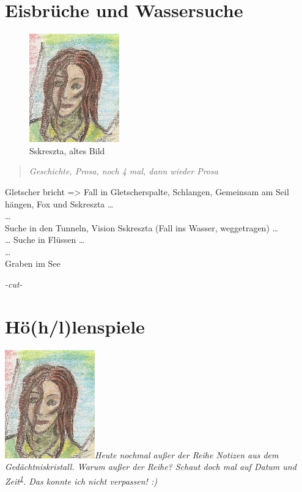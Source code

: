 \documentclass[11pt]{article}
\begin{document}
\section{Eisbrüche und Wassersuche}

\begin{figure}[htbp]
\centering
\includegraphics{sskreszta-portrait-alt-klein.png}
\caption{Sskreszta, altes Bild}
\end{figure}

\begin{quote}
\emph{Geschichte, Prosa, noch 4 mal, dann wieder Prosa}

\end{quote}
Gletscher bricht =\textgreater{} Fall in Gletscherspalte, Schlangen,
Gemeinsam am Seil hängen, Fox und Sskreszta \ldots{}\\ \ldots{}\\ Suche
in den Tunneln, Vision Sskreszta (Fall ins Wasser, weggetragen)
\ldots{}\\ \ldots{} Suche in Flüssen \ldots{}\\ \ldots{}\\ Graben im See

\emph{-cut-}

\section{Hö(h/l)lenspiele}

\includegraphics{sskreszta-portrait-alt-klein.png}\emph{Heute
nochmal außer der Reihe Notizen aus dem Gedächtniskristall. Warum außer
der Reihe? Schaut doch mal auf Datum und
Zeit\textsuperscript{\href{http://1w6.org/print/book/export/html/59\#fn:datum}{1}}.
Das konnte ich nicht verpassen! :)}
\end{document}
